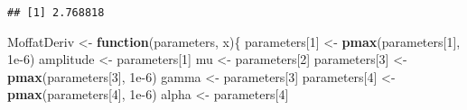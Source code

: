 \documentclass[
]{article}
\newenvironment{Shaded}{\begin{snugshade}}{\end{snugshade}}
\newcommand{\ControlFlowTok}[1]{\textcolor[rgb]{0.13,0.29,0.53}{\textbf{#1}}}
\newcommand{\DecValTok}[1]{\textcolor[rgb]{0.00,0.00,0.81}{#1}}
\newcommand{\FloatTok}[1]{\textcolor[rgb]{0.00,0.00,0.81}{#1}}
\newcommand{\FunctionTok}[1]{\textcolor[rgb]{0.13,0.29,0.53}{\textbf{#1}}}
\newcommand{\NormalTok}[1]{#1}
\newcommand{\OtherTok}[1]{\textcolor[rgb]{0.56,0.35,0.01}{#1}}
\begin{document}
\begin{verbatim}
## [1] 2.768818
\end{verbatim}

\begin{Shaded}
\begin{Highlighting}[]
\NormalTok{MoffatDeriv }\OtherTok{\textless{}{-}} \ControlFlowTok{function}\NormalTok{(parameters, x)\{}
\NormalTok{  parameters[}\DecValTok{1}\NormalTok{] }\OtherTok{\textless{}{-}} \FunctionTok{pmax}\NormalTok{(parameters[}\DecValTok{1}\NormalTok{], }\FloatTok{1e{-}6}\NormalTok{)}
\NormalTok{  amplitude }\OtherTok{\textless{}{-}}\NormalTok{ parameters[}\DecValTok{1}\NormalTok{]}
\NormalTok{  mu }\OtherTok{\textless{}{-}}\NormalTok{ parameters[}\DecValTok{2}\NormalTok{]}
\NormalTok{  parameters[}\DecValTok{3}\NormalTok{] }\OtherTok{\textless{}{-}} \FunctionTok{pmax}\NormalTok{(parameters[}\DecValTok{3}\NormalTok{], }\FloatTok{1e{-}6}\NormalTok{)}
\NormalTok{  gamma }\OtherTok{\textless{}{-}}\NormalTok{ parameters[}\DecValTok{3}\NormalTok{]}
\NormalTok{  parameters[}\DecValTok{4}\NormalTok{] }\OtherTok{\textless{}{-}} \FunctionTok{pmax}\NormalTok{(parameters[}\DecValTok{4}\NormalTok{], }\FloatTok{1e{-}6}\NormalTok{)}
\NormalTok{  alpha }\OtherTok{\textless{}{-}}\NormalTok{ parameters[}\DecValTok{4}\NormalTok{]}
  


\end{Highlighting}
\end{Shaded}
\end{document}
